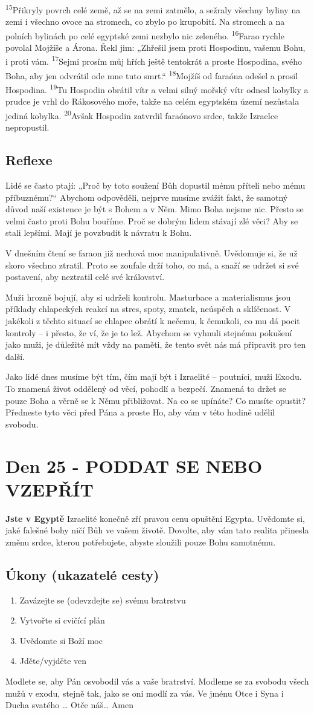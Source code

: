 \documentclass[11pt]{article}
\newcommand{\zacatekCtvrtyTyden}{
  \textbf{Jste v Egyptě} \newline
  Izraelité konečně zří pravou cenu opuštění Egypta. Uvědomte si, jaké falešné bohy ničí Bůh ve vašem životě.
Dovolte, aby vám tato realita přinesla změnu srdce, kterou potřebujete, abyste sloužili pouze Bohu samotnému.

\subsection*{Úkony (ukazatelé cesty)}
\begin{enumerate}
  \item Zavázejte se (odevzdejte se) svému bratrstvu
  \item Vytvořte si cvičící plán
  \item Uvědomte si Boží moc
  \item Jděte/vyjděte ven
\end{enumerate}
Modlete se, aby Pán osvobodil vás a vaše bratrství. \newline
Modleme se za svobodu všech mužů v exodu, stejně tak, jako se oni modlí za vás.\newline
Ve jménu Otce i Syna i Ducha svatého …  Otče náš… Amen
}
\begin{document}
{\textsuperscript{15}Přikryly povrch celé země, až se na zemi zatmělo, a sežraly všechny byliny na zemi i všechno ovoce na stromech, co zbylo po krupobití. Na stromech a na polních bylinách po celé egyptské zemi nezbylo nic zeleného.
\textsuperscript{16}Farao rychle povolal Mojžíše a Árona. Řekl jim: „Zhřešil jsem proti Hospodinu, vašemu Bohu, i proti vám.
\textsuperscript{17}Sejmi prosím můj hřích ještě tentokrát a proste Hospodina, svého Boha, aby jen odvrátil ode mne tuto smrt.“
\textsuperscript{18}Mojžíš od faraóna odešel a prosil Hospodina.
\textsuperscript{19}Tu Hospodin obrátil vítr a velmi silný mořský vítr odnesl kobylky a prudce je vrhl do Rákosového moře, takže na celém egyptském území nezůstala jediná kobylka.
\textsuperscript{20}Avšak Hospodin zatvrdil faraónovo srdce, takže Izraelce nepropustil.
}

\subsection*{Reflexe}

Lidé se často ptají: „Proč by toto soužení Bůh dopustil mému příteli nebo mému příbuznému?“ Abychom odpověděli, nejprve
musíme zvážit fakt, že samotný důvod naší existence je být s Bohem a v Něm. Mimo Boha nejsme nic. Přesto se velmi často
proti Bohu bouříme. Proč se dobrým lidem stávají zlé věci? Aby se stali lepšími. Mají je povzbudit k návratu k Bohu.

V dnešním čtení se faraon již nechová moc manipulativně. Uvědomuje si, že už skoro všechno ztratil. Proto se zoufale drží
toho, co má, a snaží se udržet si své postavení, aby neztratil celé své království.

Muži hrozně bojují, aby si udrželi kontrolu. Masturbace a materialismus jsou příklady chlapeckých reakcí na stres, spoty,
zmatek, neúspěch a sklíčenost. V jakékoli z těchto situací se chlapec obrátí k nečemu, k čemukoli, co mu dá pocit kontroly – i
přesto, že ví, že je to lež. Abychom se vyhnuli stejnému pokušení jako muži, je důležité mít vždy na paměti, že tento svět nás
má připravit pro ten další.

Jako lidé dnes musíme být tím, čím mají být i Izraelité – poutníci, muži Exodu. To znamená život oddělený od věcí, pohodlí a
bezpečí. Znamená to držet se pouze Boha a věrně se k Němu přibližovat. Na co se upínáte? Co musíte opustit? Předneste tyto
věci před Pána a proste Ho, aby vám v této hodině udělil svobodu.


\newpage
\section{Den 25 - PODDAT SE NEBO VZEPŘÍT}
\zacatekCtvrtyTyden
\end{document}
